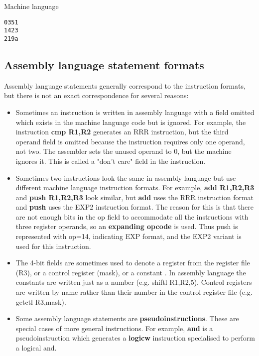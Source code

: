 \documentclass[11pt]{article}
\begin{document}
Machine language
\begin{verbatim}
0351
1423
219a
\end{verbatim}

\subsection*{Assembly language statement formats}
\label{sec:org39333fe}

Assembly language statements generally correspond to the instruction
formats, but there is not an exact correspondence for several reasons:

\begin{itemize}
\item Sometimes an instruction is written in assembly language with a
field omitted which exists in the machine language code but is
ignored.  For example, the instruction \textbf{cmp R1,R2} generates an RRR
instruction, but the third operand field is omitted because the
instruction requires only one operand, not two.  The assembler sets
the unused operand to 0, but the machine ignores it.  This is called
a "don't care" field in the instruction.

\item Sometimes two instructions look the same in assembly language but
use different machine language instruction formats.  For example,
\textbf{add R1,R2,R3} and \textbf{push R1,R2,R3} look similar, but \textbf{add} uses the
RRR instruction format and \textbf{push} uses the EXP2 instruction format.
The reason for this is that there are not enough bits in the op
field to accommodate all the instructions with three register
operands, so an \textbf{expanding opcode} is used.  Thus push is
represented with op=14, indicating EXP format, and the EXP2 variant
is used for this instruction.

\item The 4-bit fields are sometimes used to denote a register from the
register file (R3), or a control register (mask), or a constant .
In assembly language the constants are written just as a number
(e.g. shiftl R1,R2,5).  Control registers are written by name rather
than their number in the control register file (e.g. getctl
R3,mask).

\item Some assembly language statements are \textbf{pseudoinstructions}.  These
are special cases of more general instructions.  For example, \textbf{and}
is a pseudoinstruction which generates a \textbf{logicw} instruction
specialised to perform a logical and.
\end{itemize}
\end{document}
